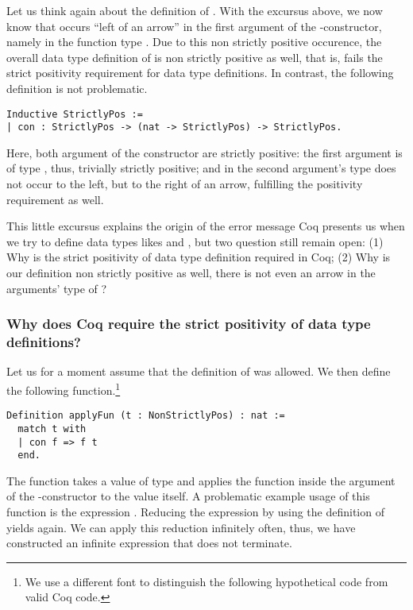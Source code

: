 Let us think again about the definition of .
With the excursus above, we now know that 
occurs ``left of an arrow''  in the first argument of the
-constructor, namely in the function type
.
Due to this non strictly positive occurence, the overall data type
definition of  is non strictly positive as well,
that is, fails the strict positivity requirement for data type
definitions.
In contrast, the following definition is not problematic.

\begin{verbatim}
Inductive StrictlyPos :=
| con : StrictlyPos -> (nat -> StrictlyPos) -> StrictlyPos.
\end{verbatim}

Here, both argument of the constructor  are strictly positive:
the first argument is of type , thus, trivially
strictly positive; and in the second argument's type 
does not occur to the left, but to the right of an arrow, fulfilling
the positivity requirement as well.

This little excursus explains the origin of the error message Coq
presents us when we try to define data types likes
 and , but two question still remain
open: (1) Why is the strict positivity of data type definition
required in Coq; (2) Why is our definition  non strictly
positive as well, there is not even an arrow in the arguments' type of
?

\subsubsection{Why does Coq require the strict positivity of data type
  definitions?}

Let us for a moment assume that the definition of
 was allowed.
We then define the following function.\footnote{We use a different
  font to distinguish the following hypothetical code from valid Coq code.}

\begin{verbatim}
Definition applyFun (t : NonStrictlyPos) : nat :=
  match t with
  | con f => f t
  end.
\end{verbatim}

The function  takes a value  of type
 and applies the function  inside the
argument of the -constructor to the value  itself.
A problematic example usage of this function is the expression
.
Reducing the expression by using the definition of  yields
 again.
We can apply this reduction infinitely often, thus, we have
constructed an infinite expression that does not terminate.

